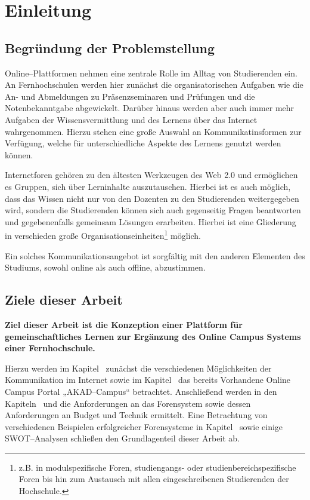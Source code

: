 \section{Einleitung} %
\label{sec:einleitung}

\subsection{Begründung der Problemstellung} %
\label{sub:begrundung_der_problemstellung}

Online--Plattformen nehmen eine zentrale Rolle im Alltag von Studierenden ein. An Fernhochschulen werden hier zunächst die organisatorischen Aufgaben wie die An- und Abmeldungen zu Präsenzseminaren und Prüfungen und die Notenbekanntgabe abgewickelt. Darüber hinaus werden aber auch immer mehr Aufgaben der Wissensvermittlung und des Lernens über das Internet wahrgenommen. Hierzu stehen eine große Auswahl an Kommunikatinsformen zur Verfügung, welche für unterschiedliche Aspekte des Lernens genutzt werden können.

Internetforen gehören zu den ältesten Werkzeugen des Web 2.0 und ermöglichen es Gruppen, sich über Lerninhalte auszutauschen. Hierbei ist es auch möglich, dass das Wissen nicht nur von den Dozenten zu den Studierenden weitergegeben wird, sondern die Studierenden können sich auch gegenseitig Fragen beantworten und gegebenenfalls gemeinsam Lösungen erarbeiten. Hierbei ist eine Gliederung in verschieden große Organisationseinheiten\footnote{z.B. in modulspezifische Foren, studiengangs- oder studienbereichspezifische Foren bis hin zum Austausch mit allen eingeschreibenen Studierenden der Hochschule.} möglich.

Ein solches Kommunikationsangebot ist sorgfältig mit den anderen Elementen des Studiums, sowohl online als auch offline, abzustimmen.

\subsection{Ziele dieser Arbeit} %
\label{sub:ziele_dieser_arbeit}
\textbf{Ziel dieser Arbeit ist die Konzeption einer Plattform für gemeinschaftliches Lernen zur Ergänzung des Online Campus Systems einer Fernhochschule.}

Hierzu werden im Kapitel~ zunächst die verschiedenen Möglichkeiten der Kommunikation im Internet sowie im Kapitel~ das bereits Vorhandene Online Campus Portal „AKAD--Campus“ betrachtet. Anschließend werden in den Kapiteln~ und  die Anforderungen an das Forensystem sowie dessen Anforderungen an Budget und Technik ermittelt. Eine Betrachtung von verschiedenen Beispielen erfolgreicher Forensysteme in Kapitel~ sowie einige SWOT--Analysen schließen den Grundlagenteil dieser Arbeit ab.

